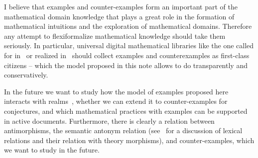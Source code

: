 \documentclass[11pt]{bluenote}
\begin{document}
I believe that examples and counter-examples form an important part of the mathematical
domain knowledge that plays a great role in the formation of mathematical intuitions and
the exploration of mathematical domains. Therefore any attempt to flexiformalize
mathematical knowledge should take them seriously. In particular, universal digital
mathematical libraries like the one called for in~\cite{Farmer:mkm11} or realized
in~\cite{IanJucKoh:sdm14,MathHub:on} should collect examples and counterexamples as
first-class citizens -- which the model proposed in this note allows to do transparently
and conservatively.

In the future we want to study how the model of examples proposed here interacts with
realms~\cite{CarFarKoh:rsckmt14}, whether we can extend it to counter-examples for
conjectures, and which mathematical practices with examples can be supported in active
documents. Furthermore, there is clearly a relation between antimorphisms, the semantic
antonym relation (see~\cite{Kohlhase:dmesmgm14} for a discussion of lexical relations and
their relation with theory morphisms), and counter-examples, which we want to study in the
future.

\printbibliography
\end{document}
